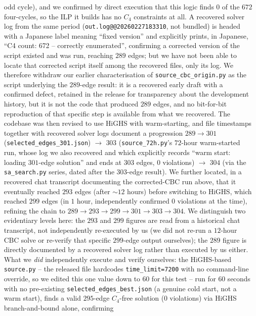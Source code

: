 \documentclass[12pt]{article}
\begin{document}
odd cycle), and we confirmed by direct execution that this logic finds
$0$ of the $672$ four-cycles, so the ILP it builds has no $C_4$
constraints at all. A recovered solver log from the same period
(\texttt{out.log@@20260227183310}, not bundled) is headed with a
Japanese label meaning ``fixed version'' and explicitly prints, in
Japanese, ``C4 count: 672 -- correctly enumerated'', confirming a
corrected version of the script existed and was run, reaching $289$
edges; but we have not been able to locate that corrected script
itself among the recovered files, only its log. We therefore withdraw
our earlier characterisation of \texttt{source\_cbc\_origin.py} as
the script underlying the $289$-edge result: it is a recovered early
draft with a confirmed defect, retained in the release for
transparency about the development history, but it is not the code
that produced $289$ edges, and no bit-for-bit reproduction of that
specific step is available from what we recovered. The codebase was then revised to use HiGHS
with warm-starting, and file timestamps together with recovered solver
logs document a progression $289\to301$
(\texttt{selected\_edges\_301.json}) $\to$ $303$
(\texttt{source\_72h.py}'s $72$-hour warm-started run, whose log we
also recovered and which explicitly records ``warm start: loading
$301$-edge solution'' and ends at $303$ edges, $0$ violations) $\to$
$304$ (via the \texttt{sa\_search.py} series, dated after the $303$-edge
result). We further located, in a recovered chat transcript
documenting the corrected-CBC run above, that it eventually reached $293$ edges
(after $\sim12$ hours) before switching to HiGHS, which reached $299$
edges (in $1$ hour, independently confirmed $0$ violations at the
time), refining the chain to
$289\to293\to299\to301\to303\to304$. We distinguish two evidentiary
levels here: the $293$ and $299$ figures are read from a historical
chat transcript, not independently re-executed by us (we did not
re-run a $12$-hour CBC solve or re-verify that specific $299$-edge
output ourselves); the $289$ figure is directly documented by a
recovered solver log rather than executed by us either. What we
\emph{did} independently execute and verify ourselves: the HiGHS-based \texttt{source.py} --
the released file hardcodes \texttt{time\_limit=7200} with no
command-line override, so we edited this one value down to $60$ for
this test -- run for $60$ seconds
with no pre-existing \texttt{selected\_edges\_best.json} (a genuine
cold start, not a warm start), finds a valid $295$-edge $C_4$-free
solution ($0$ violations) via HiGHS branch-and-bound alone, confirming
\end{document}
